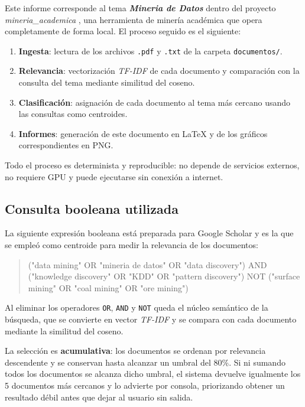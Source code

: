 \documentclass[11pt,a4paper]{article}
\newcommand{\tema}[1]{\textbf{\textit{#1}}}
\newcommand{\pcento}{\%}
\begin{document}
Este informe corresponde al tema \tema{ Mineria de Datos } dentro del
proyecto \textit{ mineria\_academica }, una herramienta de minería académica que
opera completamente de forma local. El proceso seguido es el siguiente:

\begin{enumerate}
  \item \textbf{Ingesta}: lectura de los archivos \texttt{.pdf} y
        \texttt{.txt} de la carpeta \texttt{documentos/}.
  \item \textbf{Relevancia}: vectorización \textit{TF-IDF} de cada documento
        y comparación con la consulta del tema mediante similitud del coseno.
  \item \textbf{Clasificación}: asignación de cada documento al tema más
        cercano usando las consultas como centroides.
  \item \textbf{Informes}: generación de este documento en \LaTeX{} y de los
        gráficos correspondientes en PNG.
\end{enumerate}

Todo el proceso es determinista y reproducible: no depende de servicios
externos, no requiere GPU y puede ejecutarse sin conexión a internet.

\subsection{Consulta booleana utilizada}
\label{sec:query}

La siguiente expresión booleana está preparada para Google Scholar y es la que
se empleó como centroide para medir la relevancia de los documentos:

\begin{quote}
\small\ttfamily
("data mining" OR "mineria de datos" OR "data discovery") AND ("knowledge discovery" OR "KDD" OR "pattern discovery") NOT ("surface mining" OR "coal mining" OR "ore mining")
\end{quote}

Al eliminar los operadores \texttt{OR}, \texttt{AND} y \texttt{NOT} queda el
núcleo semántico de la búsqueda, que se convierte en vector \textit{TF-IDF} y
se compara con cada documento mediante la similitud del coseno.

La selección es \textbf{acumulativa}: los documentos se ordenan por relevancia
descendente y se conservan hasta alcanzar un umbral del
80\pcento. Si ni sumando todos los documentos se alcanza
dicho umbral, el sistema devuelve igualmente los 5
documentos más cercanos y lo advierte por consola, priorizando obtener un
resultado débil antes que dejar al usuario sin salida.
\end{document}
